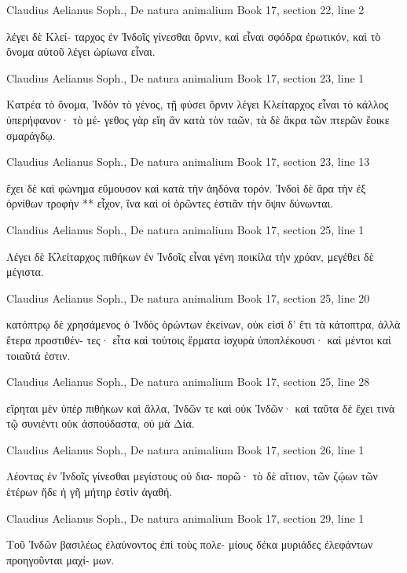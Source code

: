 \documentclass[12pt,letterpaper,twoside,final]{memoir}
\begin{document}
\begin{greek}
Claudius Aelianus Soph., De natura animalium 
Book 17, section 22, line 2

                                   λέγει δὲ Κλεί-  
ταρχος ἐν Ἰνδοῖς γίνεσθαι ὄρνιν, καὶ εἶναι σφόδρα 
ἐρωτικόν, καὶ τὸ ὄνομα αὐτοῦ λέγει ὠρίωνα εἶναι. 



Claudius Aelianus Soph., De natura animalium 
Book 17, section 23, line 1

Κατρέα τὸ ὄνομα, Ἰνδὸν τὸ γένος, τῇ φύσει ὄρνιν 
λέγει Κλείταρχος εἶναι τὸ κάλλος ὑπερήφανον· τὸ μέ-
γεθος γὰρ εἴη ἂν κατὰ τὸν ταῶν, τὰ δὲ ἄκρα τῶν 
πτερῶν ἔοικε σμαράγδῳ. 



Claudius Aelianus Soph., De natura animalium 
Book 17, section 23, line 13

                           ἔχει δὲ καὶ φώνημα εὔμουσον 
καὶ κατὰ τὴν ἀηδόνα τορόν. Ἰνδοὶ δὲ ἄρα τὴν ἐξ 
ὀρνίθων τροφὴν ** εἶχον, ἵνα καὶ οἱ ὁρῶντες ἑστιᾶν 
τὴν ὄψιν δύνωνται. 



Claudius Aelianus Soph., De natura animalium 
Book 17, section 25, line 1

Λέγει δὲ Κλείταρχος πιθήκων ἐν Ἰνδοῖς εἶναι 
γένη ποικίλα τὴν χρόαν, μεγέθει δὲ μέγιστα. 



Claudius Aelianus Soph., De natura animalium 
Book 17, section 25, line 20

κατόπτρῳ δὲ χρησάμενος ὁ Ἰνδὸς ὁρώντων ἐκείνων, 
οὐκ εἰσὶ δ' ἔτι τὰ κάτοπτρα, ἀλλὰ ἕτερα προστιθέν-
τες· εἶτα καὶ τούτοις ἕρματα ἰσχυρὰ ὑποπλέκουσι· καὶ 
μέντοι καὶ τοιαῦτά ἐστιν. 



Claudius Aelianus Soph., De natura animalium 
Book 17, section 25, line 28

           εἴρηται μὲν ὑπὲρ πιθήκων καὶ ἄλλα, Ἰνδῶν 
τε καὶ οὐκ Ἰνδῶν· καὶ ταῦτα δὲ ἔχει τινὰ τῷ συνιέντι 
οὐκ ἀσπούδαστα, οὐ μὰ Δία. 



Claudius Aelianus Soph., De natura animalium 
Book 17, section 26, line 1

Λέοντας ἐν Ἰνδοῖς γίνεσθαι μεγίστους οὐ δια-
πορῶ· τὸ δὲ αἴτιον, τῶν ζῴων τῶν ἑτέρων ἥδε ἡ γῆ 
μήτηρ ἐστὶν ἀγαθή. 



Claudius Aelianus Soph., De natura animalium 
Book 17, section 29, line 1

Τοῦ Ἰνδῶν βασιλέως ἐλαύνοντος ἐπὶ τοὺς πολε-
μίους δέκα μυριάδες ἐλεφάντων προηγοῦνται μαχί-
μων. 




\end{greek}
\end{document}
